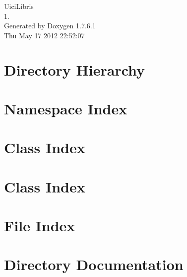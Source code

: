 \documentclass[a4paper]{book}
\begin{document}
\hypersetup{pageanchor=false,citecolor=blue}
\begin{titlepage}
\vspace*{7cm}
\begin{center}
{\Large \-Uici\-Libris \\[1ex]\large 1. }\\
\vspace*{1cm}
{\large \-Generated by Doxygen 1.7.6.1}\\
\vspace*{0.5cm}
{\small Thu May 17 2012 22:52:07}\\
\end{center}
\end{titlepage}
\clearemptydoublepage
{}
\tableofcontents
\clearemptydoublepage
{}
\hypersetup{pageanchor=true,citecolor=blue}
\chapter{\-Directory \-Hierarchy}

\chapter{\-Namespace \-Index}

\chapter{\-Class \-Index}

\chapter{\-Class \-Index}

\chapter{\-File \-Index}

\chapter{\-Directory \-Documentation}



\end{document}
